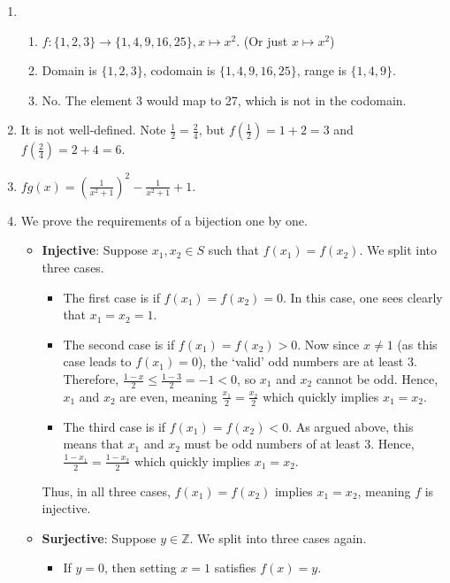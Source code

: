 \begin{enumerate}
    \item \begin{enumerate}[label=(\roman*)]
        \item $f: \{1, 2, 3\} \to \{1, 4, 9, 16, 25\}, x \mapsto x^2$. (Or just $x \mapsto x^2$)
        \item Domain is $\{1, 2, 3\}$, codomain is $\{1, 4, 9, 16, 25\}$, range is $\{1, 4, 9\}$.
        \item No. The element 3 would map to 27, which is not in the codomain.
    \end{enumerate}
    \item It is not well-defined. Note $\frac 12 = \frac 24$, but $f(\frac12) = 1 + 2 = 3$ and $f(\frac24) = 2 + 4 = 6$.
    \item $fg(x) = \left(\frac1{x^2+1}\right)^2 - \frac1{x^2+1} + 1$.
    \item We prove the requirements of a bijection one by one.
    \begin{itemize}
        \item \textbf{Injective}: Suppose $x_1, x_2 \in S$ such that $f(x_1) = f(x_2)$. We split into three cases.
        \begin{itemize}
            \item The first case is if $f(x_1) = f(x_2) = 0$. In this case, one sees clearly that $x_1 = x_2 = 1$.
            \item The second case is if $f(x_1) = f(x_2) > 0$. Now since $x \neq 1$ (as this case leads to $f(x_1) = 0$), the `valid' odd numbers are at least 3. Therefore, $\frac{1-x}{2} \leq \frac{1-3}{2} = -1 < 0$, so $x_1$ and $x_2$ cannot be odd. Hence, $x_1$ and $x_2$ are even, meaning $\frac{x_1}{2} = \frac{x_2}{2}$ which quickly implies $x_1 = x_2$.
            \item The third case is if $f(x_1) = f(x_2) < 0$. As argued above, this means that $x_1$ and $x_2$ must be odd numbers of at least 3. Hence, $\frac{1-x_1}{2} = \frac{1-x_2}{2}$ which quickly implies $x_1 = x_2$.
        \end{itemize}
        Thus, in all three cases, $f(x_1) = f(x_2)$ implies $x_1 = x_2$, meaning $f$ is injective.
        \item \textbf{Surjective}: Suppose $y \in \mathbb{Z}$. We split into three cases again.
        \begin{itemize}
            \item If $y = 0$, then setting $x = 1$ satisfies $f(x) = y$.

\end{itemize}
\end{itemize}
\end{enumerate}
